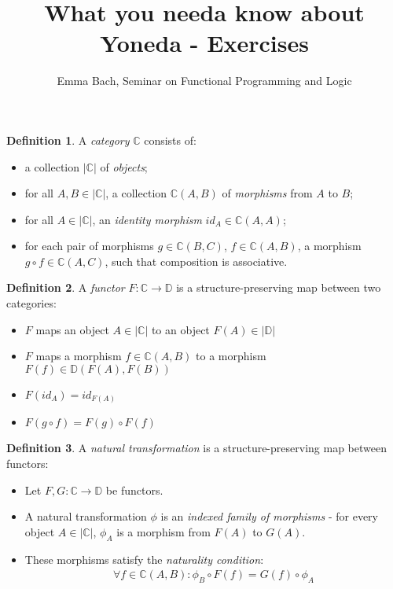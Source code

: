 \documentclass{article}
\newcommand{\bC}{\mathbb{C}}
\newcommand{\bD}{\mathbb{D}}
\begin{document}
\newtheorem{lemma}{Lemma}
\newtheorem{theorem}[lemma]{Satz}
\newtheorem{proposition}[lemma]{Proposition}
\newtheorem{anmerkung}[lemma]{Anmerkung}

\theoremstyle{definition}
\newtheorem{definition}[lemma]{Definition}
\newtheorem{example}[lemma]{Example}


\title{\Large\vspace{-1.5cm}\textbf{What you needa know about Yoneda - Exercises}}
\author{Emma Bach, Seminar on Functional Programming and Logic}
\date{}

\maketitle
\begin{definition}
	A \textit{category} $\bC$ consists of:
	\begin{itemize}
		\item a collection $|\bC|$ of \textit{objects};
		\item for all $A, B \in |\bC|$, a collection $\bC(A, B)$ of \textit{morphisms} from $A$ to $B$;
		\item for all $A \in |\bC|$, an \textit{identity morphism} $id_A \in \bC(A, A)$;
		\item for each pair of morphisms $g \in \bC(B,C)$, $f \in \bC(A,B)$, a morphism $g \circ f \in \bC(A,C)$, such that composition is associative.
	\end{itemize}
\end{definition}
\begin{definition}
	A \textit{functor} $F : \bC \to \bD$ is a structure-preserving map between two categories:
	\begin{itemize}
		\item $F$ maps an object $A \in |\bC|$ to an object $F(A) \in |\bD|$
		\item $F$ maps a morphism $f \in \bC(A,B)$ to a morphism $F(f) \in \bD(F(A),F(B))$
		\item $F(id_A) = id_{F(A)}$
		\item $F(g \circ f) = F(g) \circ F(f)$
	\end{itemize}
\end{definition}
\begin{definition}
	A \textit{natural transformation} is a structure-preserving map between functors:
	\begin{itemize}
		\item Let $F,G : \bC \to \bD$ be functors.
		\item A natural transformation $\phi$ is an \textit{indexed family of morphisms} - for every object $A \in |\bC|$,  $\phi_A$ is a morphism from $F(A)$ to $G(A)$.
		\item These morphisms satisfy the \textit{naturality condition}:
		\begin{align*}
			\forall f \in \bC(A,B) : \phi_B \circ F(f) = G(f) \circ \phi_A
		\end{align*}
	\end{itemize}
\end{definition}
\end{document}
